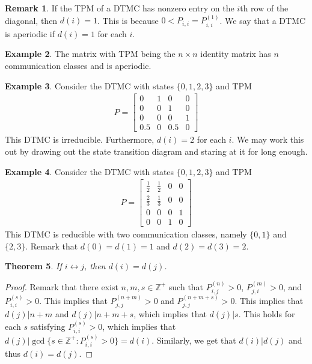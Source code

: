 \documentclass[11pt]{amsart}
\newtheorem{theorem}{Theorem}[section]
\theoremstyle{definition}
\newtheorem{remark}[theorem]{Remark}
\newtheorem{example}[theorem]{Example}
\numberwithin{equation}{section}
\begin{document}
 \begin{remark}
     If the TPM of a DTMC has nonzero entry on the $i$th row of the diagonal, then $d(i)=1$. This is because $0<P_{i,i}=P_{i,i}^{(1)}$. We say that a DTMC is aperiodic if $d(i)=1$ for each $i$.
 \end{remark}
 \begin{example}
     The matrix with TPM being the $n\times n$ identity matrix has $n$ communication classes and is aperiodic.
 \end{example}
 \begin{example}
     Consider the DTMC with states $\{0,1,2,3\}$ and TPM
     \begin{align*}
         P=\begin{bmatrix}
             0 & 1 & 0 & 0\\
             0 & 0 & 1 & 0\\
             0 & 0 & 0 & 1\\
             0.5 & 0 & 0.5 & 0
         \end{bmatrix}
     \end{align*}
     This DTMC is irreducible. Furthermore, $d(i)=2$ for each $i$. We may work this out by drawing out the state transition diagram and staring at it for long enough.
 \end{example}
 \begin{example}
     Consider the DTMC with states $\{0,1,2,3\}$ and TPM
     \begin{align*}
         P=\begin{bmatrix}
             \frac{1}{2} & \frac{1}{2} & 0 & 0\\
             \frac{2}{3} & \frac{1}{3} & 0 & 0\\
             0 & 0 & 0 & 1\\
             0 & 0 & 1 & 0
         \end{bmatrix}
     \end{align*}
     This DTMC is reducible with two communication classes, namely $\{0,1\}$ and $\{2,3\}$. Remark that $d(0)=d(1)=1$ and $d(2)=d(3)=2$.
 \end{example}
 \begin{theorem}\label{commC}
     If $i\leftrightarrow j$, then $d(i)=d(j)$.
 \end{theorem}
 \begin{proof}
     Remark that there exist $n,m,s\in\mathbb Z^+$ such that $P_{i,j}^{(n)}>0$, $P_{j,i}^{(m)}>0$, and $P_{i,i}^{(s)}>0$. This implies that $P_{j,j}^{(n+m)}>0$ and $P_{j,j}^{(n+m+s)}>0$. This implies that $d(j)|n+m$ and $d(j)|n+m+s$, which implies that $d(j)|s$. This holds for each $s$ satisfying $P_{i,i}^{(s)}>0$, which implies that $d(j)|\gcd\{s\in\mathbb Z^+:P_{i,i}^{(s)}>0\}=d(i)$. Similarly, we get that $d(i)|d(j)$ and thus $d(i)=d(j)$.
 \end{proof}
\end{document}
